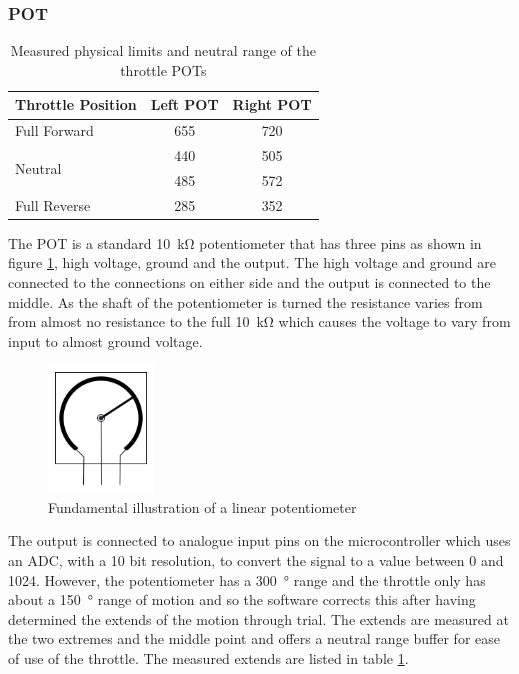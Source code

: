 		\subsubsection{POT}
			\begin{table}[ht]
			\begin{center}
				\caption{Measured physical limits and neutral range of the throttle POTs}
				\label{tab:3:POT}
				\begin{tabular}{|l|c|c|}
					\hline		
					\textbf{Throttle Position} & \textbf{Left POT} & \textbf{Right POT} \\
					\hline
					Full Forward & 655 & 720\\
					\hline
					\multirow{2}{*}{Neutral} &440 &505 \\
					&485 &572  \\
					\hline
					Full Reverse & 285 & 352 \\
					\hline
				\end{tabular}
			\end{center}
		\end{table}
		The POT is a standard \SI{10}{\kilo\ohm} potentiometer that has three pins as shown in figure \ref{fig:3:POTdraw}, high voltage, ground and the output. The high voltage and ground are connected to the connections on either side and the output is connected to the middle. As the shaft of the potentiometer is turned the resistance varies from from almost no resistance to the full \SI{10}{\kilo\ohm} which causes the voltage to vary from input to almost ground voltage.  \par
		\vspace{0.4cm}
		\begin{figure}[hb]
			\begin{center}
				\includegraphics[width = 0.25\textwidth]{figures/POT.jpg}
				\caption{Fundamental illustration of a linear potentiometer}
				\label{fig:3:POTdraw}
			\end{center}
		\end{figure}
		The output is connected to analogue input pins on the microcontroller which uses an ADC, with a 10 bit resolution, to convert the signal to a value between 0 and 1024. However, the potentiometer has a \SI{300}{\degree} range and the throttle only has about a \SI{150}{\degree} range of motion and so the software corrects this after having determined the extends of the motion through trial. The extends are measured at the two extremes and the middle point and offers a neutral range buffer for ease of use of the throttle. The measured extends are listed in table \ref{tab:3:POT}.
